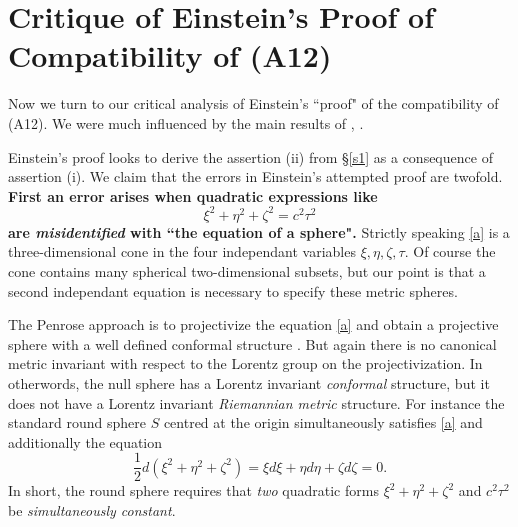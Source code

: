 \documentclass[12pt]{amsart}
\newcommand{\bR}{\mathbb{R}}
\begin{document}





\section{Critique of Einstein's Proof of Compatibility of (A12)}\label{einsteinproof}
Now we turn to our critical analysis of Einstein's ``proof" of the compatibility of (A12). We were much influenced by the main results of \cite{bryant}, \cite{crothers}. 

Einstein's proof looks to derive the assertion (ii) from \S \ref{s1} as a consequence of assertion (i). We claim that the errors in Einstein's attempted proof are twofold. \textbf{First an error arises when quadratic expressions like \begin{equation}\label{a}\xi^2+\eta^2+\zeta^2=c^2 \tau^2
\end{equation} are \emph{misidentified} with ``the equation of a sphere".} Strictly speaking \eqref{a} is a three-dimensional cone in the four independant variables $\xi, \eta, \zeta, \tau$. Of course the cone contains many spherical two-dimensional subsets, but our point is that a second independant equation is necessary to specify these metric spheres. 

The Penrose approach is to projectivize the equation \eqref{a} and obtain a projective sphere with a well defined conformal structure \cite[Ch 1.]{penrose1984spinors}. But again there is no canonical metric invariant with respect to the Lorentz group on the projectivization. In otherwords, the null sphere has a Lorentz invariant \emph{conformal} structure, but it does not have a Lorentz invariant \emph{Riemannian metric} structure. For instance the standard round sphere $S$ centred at the origin simultaneously satisfies \eqref{a} and additionally the equation $$\frac{1}{2}d(\xi^2+\eta^2+\zeta^2)=\xi d\xi+\eta d\eta +\zeta d\zeta=0.$$ In short, the round sphere requires that \emph{two} quadratic forms $\xi^2+\eta^2+\zeta^2$ and $c^2\tau^2$ be \emph{simultaneously constant}. 
\end{document}
